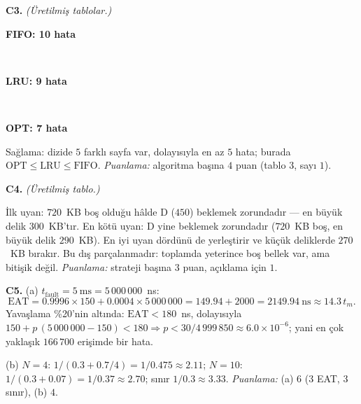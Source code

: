 \documentclass[11pt,a4paper]{article}
\begin{document}
\textbf{C3.} \textit{(Üretilmiş tablolar.)}
\begin{center}
\begin{minipage}{\linewidth}\centering\textbf{FIFO: 10 hata}\\[0.2em]\end{minipage}\\[0.8em]
\begin{minipage}{\linewidth}\centering\textbf{LRU: 9 hata}\\[0.2em]\end{minipage}\\[0.8em]
\begin{minipage}{\linewidth}\centering\textbf{OPT: 7 hata}\\[0.2em]\end{minipage}
\end{center}
Sağlama: dizide $5$ farklı sayfa var, dolayısıyla en az $5$ hata; burada $\text{OPT} \le \text{LRU} \le \text{FIFO}$. \textit{Puanlama:} algoritma başına $4$ puan (tablo $3$, sayı $1$).

\textbf{C4.} \textit{(Üretilmiş tablo.)}
\begin{center}\small{}\end{center}
İlk uyan: $720$~KB boş olduğu hâlde D ($450$) beklemek zorundadır --- en büyük delik $300$~KB'tır. En kötü uyan: D yine beklemek zorundadır ($720$~KB boş, en büyük delik $290$~KB). En iyi uyan dördünü de yerleştirir ve küçük deliklerde $270$~KB bırakır. Bu dış parçalanmadır: toplamda yeterince boş bellek var, ama bitişik değil. \textit{Puanlama:} strateji başına $3$ puan, açıklama için $1$.

\textbf{C5.} (a) $t_{\text{fault}} = 5\ \text{ms} = 5\,000\,000$~ns:
\[
\text{EAT} = 0.9996 \times 150 + 0.0004 \times 5\,000\,000 = 149.94 + 2000 = 2149.94\ \text{ns} \approx 14.3\,t_m .
\]
Yavaşlama \%20'nin altında: $\text{EAT} < 180$~ns, dolayısıyla $150 + p\,(5\,000\,000 - 150) < 180 \Rightarrow p < 30/4\,999\,850 \approx 6.0\times10^{-6}$; yani en çok yaklaşık $166\,700$ erişimde bir hata.

(b) $N = 4$: $1/(0.3 + 0.7/4) = 1/0.475 \approx 2.11$; $N = 10$: $1/(0.3 + 0.07) = 1/0.37 \approx 2.70$; sınır $1/0.3 \approx 3.33$.
\textit{Puanlama:} (a) $6$ ($3$ EAT, $3$ sınır), (b) $4$.

\end{document}
